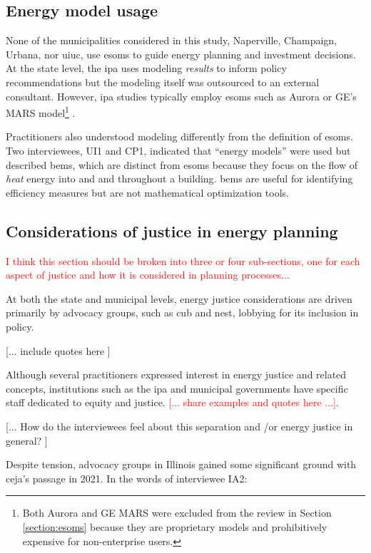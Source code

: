 \subsection{Energy model usage}

None of the municipalities considered in this study, Naperville, Champaign,
Urbana, nor \ac{uiuc}, use \acp{esom} to guide energy planning and investment
decisions. At the state level, the \ac{ipa} uses modeling \textit{results} to
inform policy recommendations but the modeling itself was outsourced to an
external consultant. However, \ac{ipa} studies typically employ \acp{esom} such
as Aurora or GE's MARS model\footnote{Both Aurora and GE MARS were excluded from
the review in Section \ref{section:esoms} because they are proprietary models
and prohibitively expensive for non-enterprise users.}
\cite{bringolf_evaluation_2024, carlson_illinois_2024}.

Practitioners also understood modeling differently from the definition of
\acp{esom}. Two interviewees, UI1 and CP1, indicated that ``energy models'' were
used but described \acp{bem}, which are distinct from \acp{esom} because they
focus on the flow of \textit{heat} energy into and and throughout a building.
\acp{bem} are useful for identifying efficiency measures but are not
mathematical optimization tools.


\subsection{Considerations of justice in energy planning}
\textcolor{red}{I think this section should be broken into three or four
sub-sections, one for each aspect of justice and how it is considered in
planning processes...}

At both the state and municipal levels, energy justice considerations are driven
primarily by advocacy groups, such as \ac{cub} and \ac{nest}, lobbying for its
inclusion in policy. 

[... include quotes here ]

Although several practitioners expressed interest in energy justice and related
concepts, institutions such as the \ac{ipa} and municipal governments have
specific staff dedicated to equity and justice. \textcolor{red}{[... share
examples and quotes here ...]}. 

[... How do the interviewees feel about this separation and /or energy justice
in general? ]

Despite tension, advocacy groups in Illinois gained some significant ground with
\ac{ceja}'s passage in 2021. In the words of interviewee IA2:

